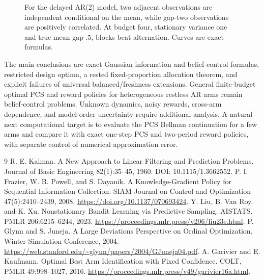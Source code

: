 \documentclass[11pt]{article}
\begin{document}
\begin{figure}[htbp]
\centering
{}
\caption{For the delayed AR(2) model, two adjacent observations are independent conditional on the mean, while gap-two observations are positively correlated. At budget four, stationary variance one and true mean gap $.5$, blocks beat alternation. Curves are exact formulas.}
\end{figure}

The main conclusions are exact Gaussian information and belief-control formulas, restricted design optima, a rested fixed-proportion allocation theorem, and explicit failures of universal balanced/freshness extensions. General finite-budget optimal PCS and reward policies for heterogeneous restless AR arms remain belief-control problems. Unknown dynamics, noisy rewards, cross-arm dependence, and model-order uncertainty require additional analysis. A natural next computational target is to evaluate the PCS Bellman continuation for a few arms and compare it with exact one-step PCS and two-period reward policies, with separate control of numerical approximation error.

\begin{thebibliography}{9}
 R. E. Kalman. A New Approach to Linear Filtering and Prediction Problems. Journal of Basic Engineering 82(1):35--45, 1960. DOI: 10.1115/1.3662552.
 P. I. Frazier, W. B. Powell, and S. Dayanik. A Knowledge-Gradient Policy for Sequential Information Collection. SIAM Journal on Control and Optimization 47(5):2410--2439, 2008. \url{https://doi.org/10.1137/070693424}.
 Y. Liu, B. Van Roy, and K. Xu. Nonstationary Bandit Learning via Predictive Sampling. AISTATS, PMLR 206:6215--6244, 2023. \url{https://proceedings.mlr.press/v206/liu23e.html}.
 P. Glynn and S. Juneja. A Large Deviations Perspective on Ordinal Optimization. Winter Simulation Conference, 2004. \url{https://web.stanford.edu/~glynn/papers/2004/GJuneja04.pdf}.
 A. Garivier and E. Kaufmann. Optimal Best Arm Identification with Fixed Confidence. COLT, PMLR 49:998--1027, 2016. \url{https://proceedings.mlr.press/v49/garivier16a.html}.
\end{thebibliography}
\end{document}
